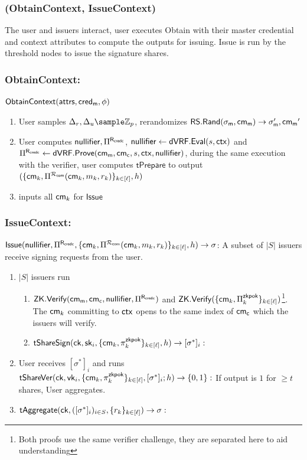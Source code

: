 \subsubsection*{(ObtainContext, IssueContext)}
The user and issuers interact, user executes Obtain with their master credential and context attributes to compute the outputs for issuing. Issue is run by the threshold nodes to issue the signature shares.
\subsubsection*{ObtainContext:}
$\mathsf{ObtainContext}(\mathsf{attrs}, \mathsf{cred_m}, \phi)$
\begin{enumerate}
    \item User samples $\Delta_r, \Delta_u \sample \Z_p$, rerandomizes $\mathsf{RS.Rand}(\sigma_{\mathsf{m}}, \mathsf{cm_m}) \to \sigma_{\mathsf{m}}', \mathsf{cm_m}'$
    \item User computes $\mathsf{nullifier}, \Pi^{\mathsf{R}_{\mathsf{credc}}}$, $\mathsf{nullifier} \gets \mathsf{dVRF.Eval}(s, \mathsf{ctx})$ and $\Pi^{\mathsf{R}_{\mathsf{credc}}} \gets \mathsf{dVRF.Prove}(\mathsf{cm_m}, \mathsf{cm_c}, s, \mathsf{ctx}, \mathsf{nullifier})$, during the same execution with the verifier, user computes  $\mathsf{tPrepare}$ to output $(\{\mathsf{cm}_k, \Pi^{\mathcal{R}_{\mathsf{com}}}(\mathsf{cm}_k, m_k, r_k)\}_{k \in [\ell]}, h)$
    \item inputs all $\mathsf{cm}_k$ for $\mathsf{Issue}$
\end{enumerate}

\subsubsection{IssueContext:}
$\mathsf{Issue}(\mathsf{nullifier}, \Pi^{\mathsf{R}_{\mathsf{credc}}}, \{\mathsf{cm}_k, \Pi^{\mathcal{R}_{\mathsf{com}}}(\mathsf{cm}_k, m_k, r_k)\}_{k \in [\ell]}, h) \to \sigma$: A subset of $|S|$ issuers receive signing requests from the user. 
\begin{enumerate}
    \item $|S|$ issuers run 
    \begin{enumerate}
        \item $\mathsf{ZK.Verify}(\mathsf{cm_m}, \mathsf{cm_c}, \mathsf{nullifier}, \Pi^{\mathsf{R}_{\mathsf{credc}}})$ and $\mathsf{ZK.Verify}(\{\mathsf{cm}_k, \Pi_k^{\mathsf{zkpok}}\}_{k \in [\ell]})$\footnote{Both proofs use the same verifier challenge, they are separated here to aid understanding}. The $\mathsf{cm}_k$ committing to $\mathsf{ctx}$ opens to the same index of $\mathsf{cm_c}$ which the issuers will verify.
        \item $\mathsf{tShareSign}(\mathsf{ck}, \mathsf{sk}_i, \{\mathsf{cm}_k, \pi_k^{\mathsf{zkpok}}\}_{k \in [\ell]}, h) \to [\sigma^*]_i:$
    \end{enumerate}
    \item User receives $[\sigma^*]_i$ and runs $\mathsf{tShareVer}(\mathsf{ck}, \mathsf{vk}_i, \{\mathsf{cm}_k, \pi_k^{\mathsf{zkpok}}\}_{k \in [\ell]}, [\sigma^*]_i; h) \to \{0,1\}:$ If output is $1$ for $\geq t$ shares, User aggregates.
    \item $\mathsf{tAggregate}(\mathsf{ck}, ([\sigma^*]_i)_{i \in S}, \{r_k\}_{k \in [\ell]}) \to \sigma:$
\end{enumerate}

